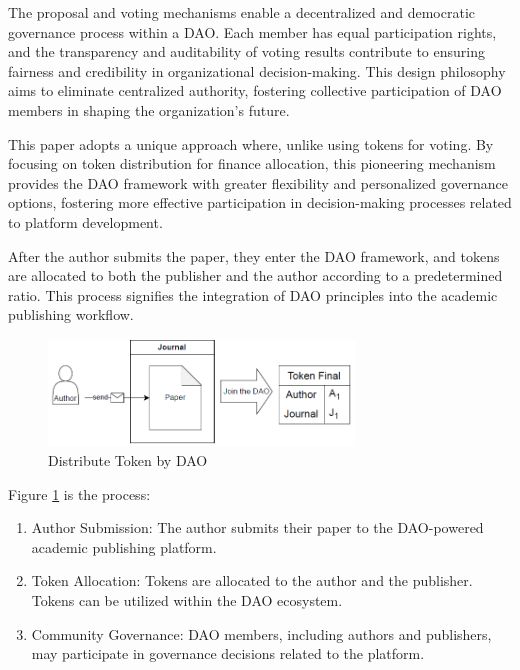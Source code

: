 \documentclass[lettersize,journal]{IEEEtran}
\begin{document}
The proposal and voting mechanisms enable a decentralized and democratic governance process within a DAO. Each member has equal participation rights, and the transparency and auditability of voting results contribute to ensuring fairness and credibility in organizational decision-making. This design philosophy aims to eliminate centralized authority, fostering collective participation of DAO members in shaping the organization's future.


This paper adopts a unique approach where, unlike using tokens for voting. By focusing on token distribution for finance allocation, this pioneering mechanism provides the DAO framework with greater flexibility and personalized governance options, fostering more effective participation in decision-making processes related to platform development.


After the author submits the paper, they enter the DAO framework, and tokens are allocated to both the publisher and the author according to a predetermined ratio. This process signifies the integration of DAO principles into the academic publishing workflow.

\begin{figure}[h]
  \centering
  \includegraphics[width=3.2in]{assets/daopaper.png}
  \caption{Distribute Token by DAO}
  \label{fig:distributetoken}
\end{figure}

Figure \ref{fig:distributetoken} is the process:

\begin{enumerate}
  \item Author Submission: The author submits their paper to the DAO-powered academic publishing platform.
  \item Token Allocation: Tokens are allocated to the author and the publisher. Tokens can be utilized within the DAO ecosystem. 
  \item Community Governance: DAO members, including authors and publishers, may participate in governance decisions related to the platform. 
\end{enumerate}
\end{document}
